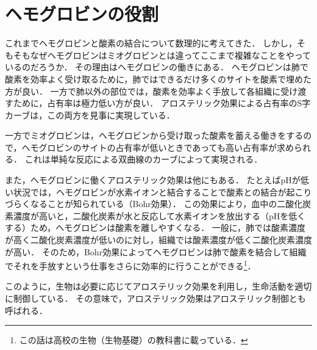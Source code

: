 \section{ヘモグロビンの役割}
これまでヘモグロビンと酸素の結合について数理的に考えてきた．
しかし，そもそもなぜヘモグロビンはミオグロビンとは違ってここまで複雑なことをやっているのだろうか．
その理由はヘモグロビンの働きにある．
ヘモグロビンは肺で酸素を効率よく受け取るために，肺ではできるだけ多くのサイトを酸素で埋めた方が良い．
一方で肺以外の部位では，酸素を効率よく手放して各組織に受け渡すために，占有率は極力低い方が良い．
アロステリック効果による占有率のS字カーブは，この両方を見事に実現している．

一方でミオグロビンは，ヘモグロビンから受け取った酸素を蓄える働きをするので，ヘモグロビンのサイトの占有率が低いときであっても高い占有率が求められる．
これは単純な反応による双曲線のカーブによって実現される．

また，ヘモグロビンに働くアロステリック効果は他にもある．
たとえばpHが低い状況では，ヘモグロビンが水素イオンと結合することで酸素との結合が起こりづらくなることが知られている（Bohr効果）\cite{bohr}．
この効果により，血中の二酸化炭素濃度が高いと，二酸化炭素が水と反応して水素イオンを放出する（pHを低くする）ため，ヘモグロビンは酸素を離しやすくなる．
一般に，肺では酸素濃度が高く二酸化炭素濃度が低いのに対し，組織では酸素濃度が低く二酸化炭素濃度が高い．
そのため，Bohr効果によってヘモグロビンは肺で酸素を結合して組織でそれを手放すという仕事をさらに効率的に行うことができる\footnote{この話は高校の生物（生物基礎）の教科書に載っている．}．

このように，生物は必要に応じてアロステリック効果を利用し，生命活動を適切に制御している．
その意味で，アロステリック効果はアロステリック制御とも呼ばれる．